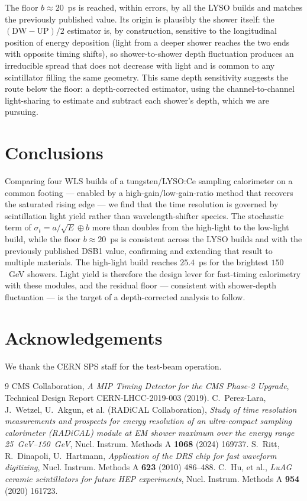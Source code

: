 \documentclass[final,5p,times,twocolumn]{elsarticle}
\begin{document}
The floor $b\approx20$~ps is reached, within errors, by all the LYSO builds and matches
the previously published value. Its origin is plausibly the shower itself: the
$(\mathrm{DW}-\mathrm{UP})/2$ estimator is, by construction, sensitive to the
longitudinal position of energy deposition (light from a deeper shower reaches the two
ends with opposite timing shifts), so shower-to-shower depth fluctuation produces an
irreducible spread that does not decrease with light and is common to any scintillator
filling the same geometry. This same depth sensitivity suggests the route below the
floor: a depth-corrected estimator, using the channel-to-channel light-sharing to
estimate and subtract each shower's depth, which we are pursuing.

\section{Conclusions}
\label{sec:conclusions}

Comparing four WLS builds of a tungsten/LYSO:Ce sampling calorimeter on a common
footing --- enabled by a high-gain/low-gain-ratio method that recovers the saturated
rising edge --- we find that the time resolution is governed by scintillation light
yield rather than wavelength-shifter species. The stochastic term of
$\sigma_t=a/\sqrt{E}\oplus b$ more than doubles from the high-light to the low-light
build, while the floor $b\approx20$~ps is consistent across the LYSO builds and with the
previously published DSB1 value, confirming and extending that result to multiple
materials. The high-light build reaches $25.4$~ps for the brightest $150$~GeV showers.
Light yield is therefore the design lever for fast-timing calorimetry with these
modules, and the residual floor --- consistent with shower-depth fluctuation --- is the
target of a depth-corrected analysis to follow.

\section*{Acknowledgements}
We thank the CERN SPS staff for the test-beam operation. %

\begin{thebibliography}{9}
 CMS Collaboration, \textit{A MIP Timing Detector for the CMS Phase-2
Upgrade}, Technical Design Report CERN-LHCC-2019-003 (2019).
 C.~Perez-Lara, J.~Wetzel, U.~Akgun, et al. (RADiCAL Collaboration),
\textit{Study of time resolution measurements and prospects for energy resolution of
an ultra-compact sampling calorimeter (RADiCAL) module at EM shower maximum over the
energy range 25~GeV--150~GeV}, Nucl. Instrum. Methods A \textbf{1068} (2024) 169737.
 S.~Ritt, R.~Dinapoli, U.~Hartmann, \textit{Application of the DRS chip
for fast waveform digitizing}, Nucl. Instrum. Methods A \textbf{623} (2010) 486--488.
 C.~Hu, et al., \textit{LuAG ceramic scintillators for future HEP
experiments}, Nucl. Instrum. Methods A \textbf{954} (2020) 161723.
\end{thebibliography}
\end{document}
